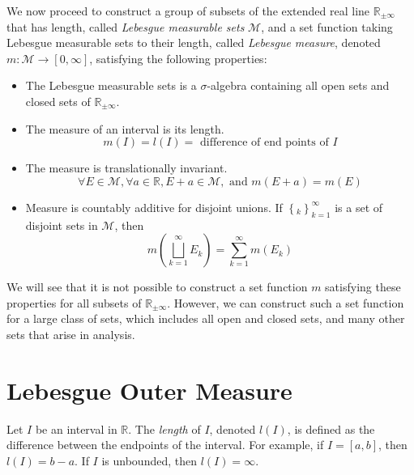 \documentclass[../main.tex]{subfiles}
\begin{document}
We now proceed to construct a group of subsets of the extended real line $\mathbb{R}_{\pm \infty }$ that has length, called \emph{Lebesgue measurable sets} $\mathcal{M}$, and a set function taking Lebesgue measurable sets to their length, called \emph{Lebesgue measure}, denoted $m: \mathcal{M} \rightarrow [0, \infty ]$, satisfying the following properties:

\begin{itemize}
	\item The Lebesgue measurable sets is a $\sigma$-algebra containing all open sets and closed sets of $\mathbb{R}_{\pm \infty }$.
	\item The measure of an interval is its length.
		\begin{equation*}
			m(I) = l(I) = \text{ difference of end points of } I
		\end{equation*}
	\item The measure is translationally invariant.
		\begin{equation*}
			\forall E\in \mathcal{M}, \forall a\in \mathbb{R}, E+a\in \mathcal{M}, \text{ and } m(E+a) = m(E)
		\end{equation*}
	\item Measure is countably additive for disjoint unions. If $\left\{ _k \right\}_{k=1}^{\infty }$ is a set of disjoint sets in $\mathcal{M}$, then
		\begin{equation*}
			m\left( \bigsqcup_{k=1}^{\infty } E_k \right) = \sum_{k=1}^{\infty } m(E_k)
		\end{equation*}
\end{itemize}

We will see that it is not possible to construct a set function $m$ satisfying these properties for all subsets of $\mathbb{R}_{\pm \infty }$. However, we can construct such a set function for a large class of sets, which includes all open and closed sets, and many other sets that arise in analysis.

\section{Lebesgue Outer Measure}
Let $I$ be an interval in $\mathbb{R}$. The \emph{length} of $I$, denoted $l(I)$, is defined as the difference between the endpoints of the interval. For example, if $I = [a, b]$, then $l(I) = b - a$. If $I$ is unbounded, then $l(I) = \infty$.
\end{document}
